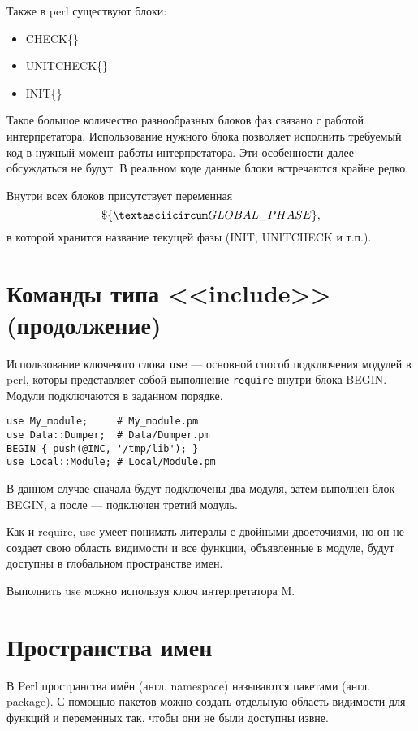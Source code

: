 Также в perl существуют блоки:
\begin{itemize}
	\item CHECK\{\}
	\item UNITCHECK\{\}
	\item INIT\{\}
\end{itemize}
Такое большое количество разнообразных блоков фаз связано с работой интерпретатора. Использование нужного блока позволяет исполнить требуемый код в нужный момент работы интерпретатора. Эти особенности далее обсуждаться не будут. В реальном коде данные блоки встречаются крайне редко.

Внутри всех блоков присутствует переменная
\[ \$\{ \textasciicircum GLOBAL \_ PHASE \}, \]
в которой хранится название текущей фазы (INIT, UNITCHECK и т.п.).

\section{Команды типа <<include>> (продолжение)} %
Использование ключевого слова \textbf{use} --- основной способ подключения модулей в perl, которы представляет собой выполнение \verb|require| внутри блока BEGIN. Модули подключаются в заданном порядке.
\begin{verbatim}
use My_module;     # My_module.pm
use Data::Dumper;  # Data/Dumper.pm
BEGIN { push(@INC, '/tmp/lib'); }
use Local::Module; # Local/Module.pm
\end{verbatim}
В данном случае сначала будут подключены два модуля, затем выполнен блок BEGIN, а после --- подключен третий модуль.

Как и require, use умеет понимать литералы с двойными двоеточиями, но он не создает свою область видимости и все функции, объявленные в модуле, будут доступны в глобальном пространстве имен.

Выполнить use можно используя ключ интерпретатора M.

\section{Пространства имен} %
В Perl пространства имён (англ. namespace) называются пакетами (англ. package). С помощью пакетов можно создать отдельную область видимости для функций и переменных так, чтобы они не были доступны извне.

